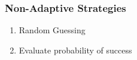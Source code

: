 \documentclass{beamer}
\begin{document}
    \begin{frame}
    \frametitle{Non-Adaptive Strategies}
    	\begin{enumerate}[label=\roman*.]
		\item Random Guessing
		\item Evaluate probability of success
		\end{enumerate}
    \end{frame}
    


\end{document}

